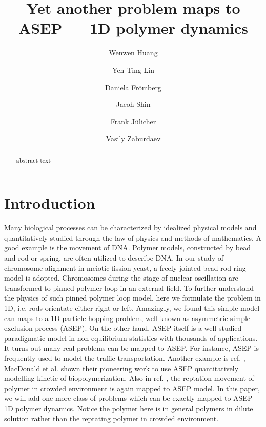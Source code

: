 \documentclass[aps,showpacs,twocolumn,floatfix,prx,superscriptaddress]{revtex4-1}
\begin{document}
\title{Yet another problem maps to ASEP --- 1D polymer dynamics}

\author{Wenwen Huang}
\author{Yen Ting Lin}
\author{Daniela Fr\"{o}mberg}
\author{Jaeoh Shin}
\author{Frank J\"{u}licher}
\author{Vasily Zaburdaev}

\begin{abstract}
    { abstract text }
\end{abstract}
\maketitle


\section{Introduction}
Many biological processes can be characterized by idealized physical models and
quantitatively studied through the law of physics and methods of mathematics.  A
good example is the movement of DNA. Polymer models, constructed by bead and rod
or spring, are often utilized to describe DNA\cite{}.  In our study of
chromosome alignment in meiotic fission yeast, a freely jointed bead rod ring
model is adopted\cite{}. Chromosomes during the stage of nuclear oscillation are
transformed to pinned polymer loop in an external field\cite{}. To further
understand the physics of such pinned polymer loop model, here we formulate the
problem in 1D, i.e. rods orientate either right or left. Amazingly, we found
this simple model can maps to a 1D particle hopping problem, well known as
asymmetric simple exclusion process (ASEP)\cite{}. On the other hand, ASEP
itself is a well studied paradigmatic model in non-equilibrium statistics with
thousands of applications\cite{}. It turns out many real problems can be mapped
to ASEP.  For instance, ASEP is frequently used to model the traffic
transportation\cite{}.  Another example is ref. \cite{}, MacDonald et al. shown
their pioneering work to use ASEP quantitatively modelling kinetic of
biopolymerization. Also in ref.  \cite{}, the reptation movement of polymer in
crowded environment is again mapped to ASEP model.  In this paper, we will add
one more class of problems which can be exactly mapped to ASEP --- 1D polymer
dynamics. Notice the polymer here is in general polymers in dilute solution rather
than the reptating polymer in crowded environment.  
\end{document}
